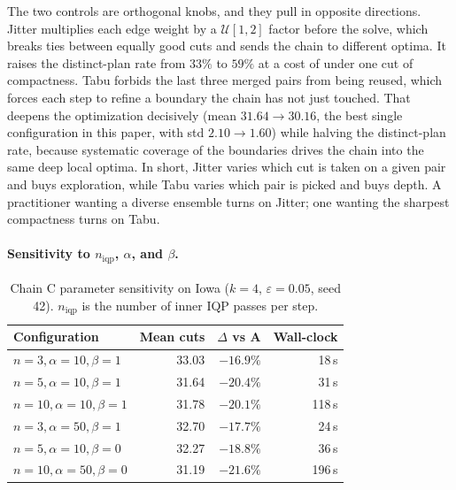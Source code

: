 \documentclass[11pt]{article}
\begin{document}
The two controls are orthogonal knobs, and they pull in opposite
directions. Jitter multiplies each edge weight by a
$\mathcal{U}[1,2]$ factor before the solve, which breaks ties between
equally good cuts and sends the chain to different optima. It raises
the distinct-plan rate from $33\%$ to $59\%$ at a cost of under one
cut of compactness. Tabu forbids the last three merged pairs from
being reused, which forces each step to refine a boundary the chain
has not just touched. That deepens the optimization decisively (mean
$31.64 \to 30.16$, the best single configuration in this paper, with
std $2.10 \to 1.60$) while halving the distinct-plan rate, because
systematic coverage of the boundaries drives the chain into the same
deep local optima. In short, Jitter varies which cut is taken on a
given pair and buys exploration, while Tabu varies which pair is
picked and buys depth. A practitioner wanting a diverse ensemble
turns on Jitter; one wanting the sharpest compactness turns on Tabu.

\paragraph{Sensitivity to $n_{\mathrm{iqp}}$, $\alpha$, and $\beta$.}\label{sec:exp-sensitivity}

\begin{table}[H]
\centering
\small
\begin{tabular}{lrrr}
\toprule
Configuration & Mean cuts & $\Delta$ vs A & Wall-clock \\
\midrule
$n = 3, \alpha = 10, \beta = 1$  & 33.03 & $-16.9\%$ & 18\,s \\
$n = 5, \alpha = 10, \beta = 1$  & 31.64 & $-20.4\%$ & 31\,s \\
$n = 10, \alpha = 10, \beta = 1$ & 31.78 & $-20.1\%$ & 118\,s \\
$n = 3, \alpha = 50, \beta = 1$  & 32.70 & $-17.7\%$ & 24\,s \\
$n = 5, \alpha = 10, \beta = 0$  & 32.27 & $-18.8\%$ & 36\,s \\
$n = 10, \alpha = 50, \beta = 0$ & 31.19 & $-21.6\%$ & 196\,s \\
\bottomrule
\end{tabular}
\caption{Chain C parameter sensitivity on Iowa ($k = 4$,
  $\varepsilon = 0.05$, seed 42). $n_{\mathrm{iqp}}$ is the number of
  inner IQP passes per step.}\label{tab:sensitivity}
\end{table}
\end{document}
